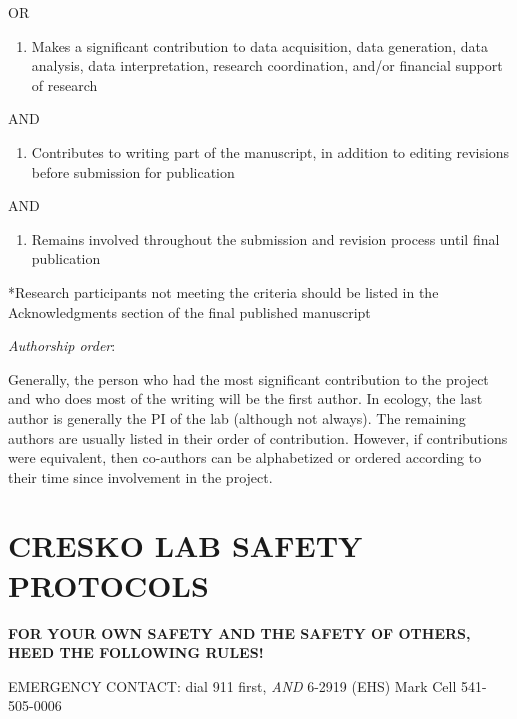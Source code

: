 \documentclass[
]{book}
\providecommand{\tightlist}{%
  \setlength{\itemsep}{0pt}\setlength{\parskip}{0pt}}
\begin{document}
OR

\begin{enumerate}
\def\labelenumi{\arabic{enumi})}
\setcounter{enumi}{1}
\tightlist
\item
  Makes a significant contribution to data acquisition, data generation, data analysis, data
  interpretation, research coordination, and/or financial support of research
\end{enumerate}

AND

\begin{enumerate}
\def\labelenumi{\arabic{enumi})}
\setcounter{enumi}{2}
\tightlist
\item
  Contributes to writing part of the manuscript, in addition to editing revisions before
  submission for publication
\end{enumerate}

AND

\begin{enumerate}
\def\labelenumi{\arabic{enumi})}
\setcounter{enumi}{3}
\tightlist
\item
  Remains involved throughout the submission and revision process until final publication
\end{enumerate}

*Research participants not meeting the criteria should be listed in the Acknowledgments
section of the final published manuscript

\emph{Authorship order}:

Generally, the person who had the most significant contribution to the project and who does
most of the writing will be the first author. In ecology, the last author is generally the PI of the
lab (although not always). The remaining authors are usually listed in their order of
contribution. However, if contributions were equivalent, then co-authors can be alphabetized
or ordered according to their time since involvement in the project.

\hypertarget{cresko-lab-safety-protocols}{%
\chapter{CRESKO LAB SAFETY PROTOCOLS}\label{cresko-lab-safety-protocols}}

\textbf{FOR YOUR OWN SAFETY AND THE SAFETY OF OTHERS, HEED THE FOLLOWING RULES!}

EMERGENCY CONTACT: dial 911 first, \emph{AND} 6-2919 (EHS) \textbar{} Mark Cell 541-505-0006
\end{document}
